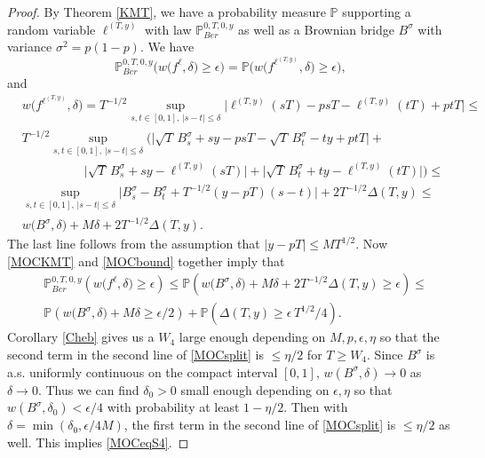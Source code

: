 \begin{proof}
	By Theorem \ref{KMT}, we have a probability measure $\mathbb{P}$ supporting a random variable $\ell^{(T,y)}$ with law $\mathbb{P}^{0,T,0,y}_{Ber}$ as well as a Brownian bridge $B^\sigma$ with variance $\sigma^2 = p(1-p)$. We have
	\begin{equation}\label{MOCKMT}
	\mathbb{P}^{0,T,0,y}_{Ber}\Big( w\big({f^\ell},\delta\big) \geq \epsilon \Big) = \mathbb{P}\Big( w\big(f^{\ell^{(T,y)}},\delta\big) \geq \epsilon \Big),
	\end{equation}
	and
	\begin{equation}\label{MOCbound}
	\begin{split}
	& w\big(f^{\ell^{(T,y)}},\delta\big) = T^{-1/2} \sup_{s,t\in[0,1],\, |s-t|\leq\delta} \Big| \ell^{(T,y)}(sT) - psT - \ell^{(T,y)}(tT) + ptT \Big| \leq\\
	&T^{-1/2} \sup_{s,t \in [0,1], \, |s-t| \leq \delta} \Big(\big| \sqrt{T}\,B^\sigma_s + sy - psT - \sqrt{T}\,B^\sigma_t - ty + ptT \big| +\\
	&\qquad \qquad \quad \big|\sqrt{T}\,B^\sigma_s + sy - \ell^{(T,y)}(sT)\big| + \big|\sqrt{T}\,B^\sigma_t + ty - \ell^{(T,y)}(tT)\big|\Big) \leq\\
	& \sup_{s,t \in [0,1], \, |s-t| \leq \delta} \Big| B^\sigma_s - B^\sigma_t + T^{-1/2} (y-pT)(s-t)\Big| + 2T^{-1/2}\Delta(T,y) \leq\\
	& w\big(B^\sigma,\delta\big) + M\delta + 2T^{-1/2}\Delta(T,y).
	\end{split}
	\end{equation}
	The last line follows from the assumption that $|y-pT|\leq MT^{1/2}$. Now \eqref{MOCKMT} and \eqref{MOCbound} together imply that
	\begin{equation}\label{MOCsplit}
	\begin{split}
	&\mathbb{P}^{0,T,0,y}_{Ber}\left( w\big(f^{\ell},\delta\big) \geq \epsilon \right) \leq \mathbb{P}\left( w\big(B^\sigma,\delta\big) + M\delta + 2T^{-1/2}\Delta(T,y) \geq \epsilon \right) \leq\\
	&\mathbb{P}\left( w\big(B^\sigma,\delta\big) + M\delta \geq \epsilon/2 \right) + \mathbb{P}\left( \Delta(T,y) \geq \epsilon\, T^{1/2}/4 \right).
	\end{split}
	\end{equation}
	Corollary \ref{Cheb} gives us a $W_4$ large enough depending on $M,p,\epsilon,\eta$ so that the second term in the second line of \ref{MOCsplit} is $\leq\eta/2$ for $T\geq W_4$. Since $B^\sigma$ is a.s. uniformly continuous on the compact interval $[0,1]$, $w(B^\sigma,\delta) \to 0$ as $\delta\to 0$. Thus we can find $\delta_0>0$ small enough depending on $\epsilon,\eta$ so that $w(B^\sigma,\delta_0) < \epsilon/4$ with probability at least $1-\eta/2$. Then with $\delta = \min(\delta_0, \epsilon/4M)$, the first term in the second line of \eqref{MOCsplit} is $\leq\eta/2$ as well. This implies \eqref{MOCeqS4}.
\end{proof}

